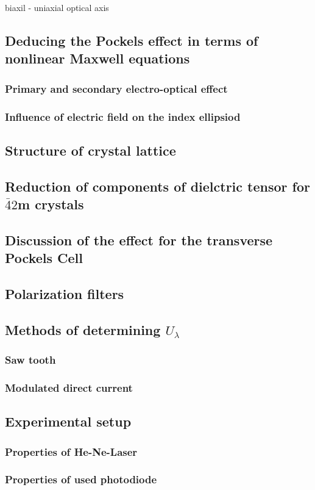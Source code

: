 biaxil - uniaxial 
optical axis 


\subsection{Deducing the Pockels effect in terms of nonlinear Maxwell equations}
\subsubsection{Primary and secondary electro-optical effect}
\subsubsection{Influence of electric field on the index ellipsiod}

\subsection{Structure of crystal lattice}

\subsection{Reduction of components of dielctric tensor for $\bar{4}2$m crystals}

\subsection{Discussion of the effect for the transverse Pockels Cell}

\subsection{Polarization filters}

\subsection{Methods of determining $U_\lambda$}
\subsubsection{Saw tooth}
\subsubsection{Modulated direct current}

\subsection{Experimental setup}
\subsubsection{Properties of He-Ne-Laser}
\subsubsection{Properties of used photodiode}
